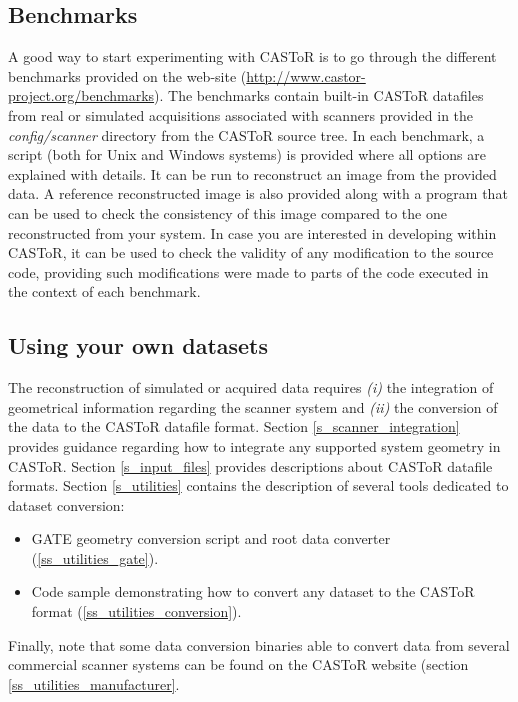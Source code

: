 \documentclass[a4paper, 11pt]{article}
\begin{document}
\subsection{Benchmarks}
\label{ss_quickstart_benchmarks}

A good way to start experimenting with CASToR is to go through the different benchmarks provided on the web-site (\url{http://www.castor-project.org/benchmarks}).
The benchmarks contain built-in CASToR datafiles from real or simulated acquisitions associated with scanners provided in the \textit{config/scanner} directory
from the CASToR source tree. In each benchmark, a script (both for Unix and Windows systems) is provided where all options are explained with details. It can be
run to reconstruct an image from the provided data. A reference reconstructed image is also provided along with a program that can be used to check the consistency
of this image compared to the one reconstructed from your system. In case you are interested in developing within CASToR, it can be used to check
the validity of any modification to the source code, providing such modifications were made to parts of the code executed in the context of each benchmark.

\subsection{Using your own datasets}
\label{ss_quickstart_owndata}

The reconstruction of simulated or acquired data requires \textit{(i)} the integration of geometrical information regarding the scanner system and \textit{(ii)}
the conversion of the data to the CASToR datafile format. Section \ref{s_scanner_integration} provides guidance regarding how to integrate any supported system
geometry in CASToR. Section \ref{s_input_files} provides descriptions about CASToR datafile formats. Section \ref{s_utilities} contains the description of several
tools dedicated to dataset conversion:
\begin{itemize}
  \item GATE geometry conversion script and root data converter (\ref{ss_utilities_gate}).
  \item Code sample demonstrating how to convert any dataset to the CASToR format (\ref{ss_utilities_conversion}).
\end{itemize}
Finally, note that some data conversion binaries able to convert data from several commercial scanner systems can be found on the CASToR website (section \ref{ss_utilities_manufacturer}.
\end{document}
